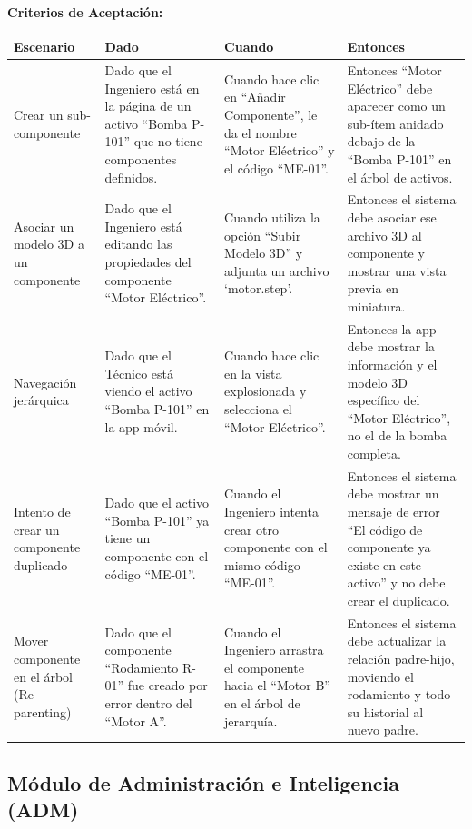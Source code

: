 \noindent
\textbf{Criterios de Aceptación:}
\footnotesize
\begin{longtable}{|p{}|p{}|p{}|p{}|}
\hline
\textbf{Escenario} & \textbf{Dado} & \textbf{Cuando} & \textbf{Entonces} \\ \hline
\endhead
Crear un sub-componente & Dado que el Ingeniero está en la página de un activo ``Bomba P-101'' que no tiene componentes definidos. & Cuando hace clic en ``Añadir Componente'', le da el nombre ``Motor Eléctrico'' y el código ``ME-01''. & Entonces ``Motor Eléctrico'' debe aparecer como un sub-ítem anidado debajo de la ``Bomba P-101'' en el árbol de activos. \\ \hline
Asociar un modelo 3D a un componente & Dado que el Ingeniero está editando las propiedades del componente ``Motor Eléctrico''. & Cuando utiliza la opción ``Subir Modelo 3D'' y adjunta un archivo `motor.step'. & Entonces el sistema debe asociar ese archivo 3D al componente y mostrar una vista previa en miniatura. \\ \hline
Navegación jerárquica & Dado que el Técnico está viendo el activo ``Bomba P-101'' en la app móvil. & Cuando hace clic en la vista explosionada y selecciona el ``Motor Eléctrico''. & Entonces la app debe mostrar la información y el modelo 3D específico del ``Motor Eléctrico'', no el de la bomba completa. \\ \hline
Intento de crear un componente duplicado & Dado que el activo ``Bomba P-101'' ya tiene un componente con el código ``ME-01''. & Cuando el Ingeniero intenta crear otro componente con el mismo código ``ME-01''. & Entonces el sistema debe mostrar un mensaje de error ``El código de componente ya existe en este activo'' y no debe crear el duplicado. \\ \hline
Mover componente en el árbol (Re-parenting) & Dado que el componente ``Rodamiento R-01'' fue creado por error dentro del ``Motor A''. & Cuando el Ingeniero arrastra el componente hacia el ``Motor B'' en el árbol de jerarquía. & Entonces el sistema debe actualizar la relación padre-hijo, moviendo el rodamiento y todo su historial al nuevo padre. \\ \hline
\end{longtable}
\normalsize

\subsection{Módulo de Administración e Inteligencia (ADM)}

